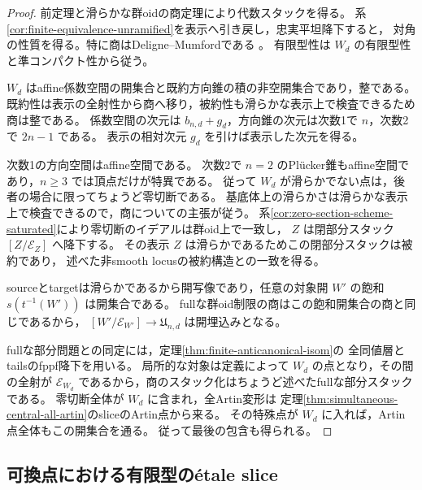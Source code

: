 \begin{proof}
前定理と滑らかな群oidの商定理\cite[Tag 04TK]{StacksProject}により代数スタックを得る。
系\ref{cor:finite-equivalence-unramified}を表示へ引き戻し，忠実平坦降下すると，
対角の性質を得る。特に商はDeligne--Mumfordである
\cite[Tag 06N3]{StacksProject}。
有限型性は $W_d$ の有限型性と準コンパクト性から従う。

$W_d$ はaffine係数空間の開集合と既約方向錐の積の非空開集合であり，整である。
既約性は表示の全射性から商へ移り，被約性も滑らかな表示上で検査できるため商は整である。
係数空間の次元は $b_{n,d}+g_d$，方向錐の次元は次数1で $n$，次数2で $2n-1$ である。
表示の相対次元 $g_d$ を引けば表示した次元を得る。

次数1の方向空間はaffine空間である。
次数2で $n=2$ のPl\"ucker錐もaffine空間であり，$n\ge3$ では頂点だけが特異である。
従って $W_d$ が滑らかでない点は，後者の場合に限ってちょうど零切断である。
基底体上の滑らかさは滑らかな表示上で検査できるので，商についての主張が従う。
系\ref{cor:zero-section-scheme-saturated}により零切断のイデアルは群oid上で一致し，
$Z$ は閉部分スタック $[Z/\mathcal E_Z]$ へ降下する。
その表示 $Z$ は滑らかであるためこの閉部分スタックは被約であり，
述べた非smooth locusの被約構造との一致を得る。

sourceとtargetは滑らかであるから開写像であり，任意の対象開 $W'$ の飽和
$s(t^{-1}(W'))$ は開集合である。
fullな群oid制限の商はこの飽和開集合の商と同じであるから，
$[W'/\mathcal E_{W'}]\to\mathfrak U_{n,d}$ は開埋込みとなる。

fullな部分問題との同定には，定理\ref{thm:finite-anticanonical-isom}の
全同値層とtailsのfppf降下を用いる。
局所的な対象は定義によって $W_d$ の点となり，その間の全射が
$\mathcal E_{W_d}$ であるから，商のスタック化はちょうど述べたfullな部分スタックである。
零切断全体が $W_d$ に含まれ，全Artin変形は
定理\ref{thm:simultaneous-central-all-artin}のsliceのArtin点から来る。
その特殊点が $W_d$ に入れば，Artin点全体もこの開集合を通る。
従って最後の包含も得られる。
\end{proof}

\subsection{可換点における有限型の\'{e}tale slice}

